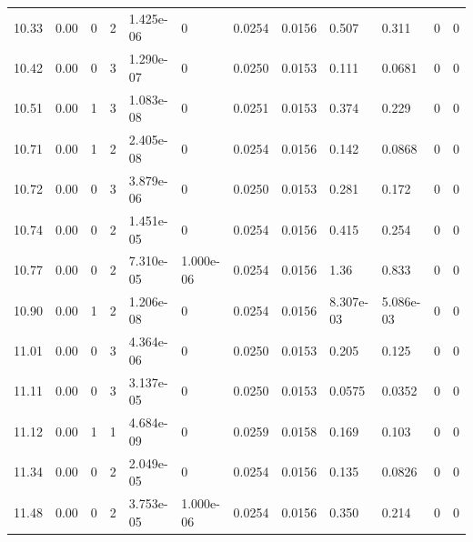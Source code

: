 \documentclass[preview]{standalone}
\begin{document}
{{{\begin{tabular}{L{1.2cm}C{1.2cm} C{0.3cm}C{0.5cm} C{1.4cm}C{1.4cm} C{1.4cm}C{1.4cm} C{1.6cm}C{1.6cm} C{1.6cm}C{1.6cm}}
  10.33  &  0.00  & 0     &  2 &  1.425e-06  & 0  &  0.0254&   0.0156& 0.507 & 0.311   &  0 & 0  \\ 
  10.42  &  0.00  & 0     &  3 &  1.290e-07  & 0  &  0.0250&   0.0153& 0.111 & 0.0681   &  0 & 0  \\ 
  10.51  &  0.00  & 1     &  3 &  1.083e-08  & 0  &  0.0251&   0.0153& 0.374 & 0.229   &  0 & 0  \\ 
  10.71  &  0.00  & 1     &  2 &  2.405e-08  & 0  &  0.0254&   0.0156& 0.142 & 0.0868   &  0 & 0  \\ 
  10.72  &  0.00  & 0     &  3 &  3.879e-06  & 0  &  0.0250&   0.0153& 0.281 & 0.172   &  0 & 0  \\ 
  10.74  &  0.00  & 0     &  2 &  1.451e-05  & 0  &  0.0254&   0.0156& 0.415 & 0.254   &  0 & 0  \\ 
  10.77  &  0.00  & 0     &  2 &  7.310e-05  & 1.000e-06  &  0.0254&   0.0156& 1.36 & 0.833   &  0 & 0  \\ 
  10.90  &  0.00  & 1     &  2 &  1.206e-08  & 0  &  0.0254&   0.0156& 8.307e-03 & 5.086e-03   &  0 & 0  \\ 
  11.01  &  0.00  & 0     &  3 &  4.364e-06  & 0  &  0.0250&   0.0153& 0.205 & 0.125   &  0 & 0  \\ 
  11.11  &  0.00  & 0     &  3 &  3.137e-05  & 0  &  0.0250&   0.0153& 0.0575 & 0.0352   &  0 & 0  \\ 
  11.12  &  0.00  & 1     &  1 &  4.684e-09  & 0  &  0.0259&   0.0158& 0.169 & 0.103   &  0 & 0  \\ 
  11.34  &  0.00  & 0     &  2 &  2.049e-05  & 0  &  0.0254&   0.0156& 0.135 & 0.0826   &  0 & 0  \\ 
  11.48  &  0.00  & 0     &  2 &  3.753e-05  & 1.000e-06  &  0.0254&   0.0156& 0.350 & 0.214   &  0 & 0  \\ 
\hline 
\end{tabular} 

}}}
\end{document}
